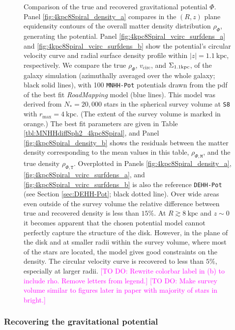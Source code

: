 \documentclass[iop,revtex4,numberedappendix,appendixfloats]{emulateapj}
\newcommand{\RM}{{\sl RoadMapping}}
\newcommand{\Wilma}[1]{\textcolor{Magenta}{#1}}
\begin{document}
\begin{figure}[!htbp]
\begin{minipage}{\textwidth}
    \end{minipage}
    \caption{Comparison of the true and recovered gravitational potential $\Phi$. Panel \ref{fig:4kpc8Spiral_density_a} compares in the $(R,z)$ plane equidensity contours of the overall matter density distribution $\rho_{\Phi}$, generating the potential. Panel \ref{fig:4kpc8Spiral_vcirc_surfdens_a} and \ref{fig:4kpc8Spiral_vcirc_surfdens_b} show the potential's circular velocity curve and radial surface density profile within $|z|=1.1~\text{kpc}$, respectively. We compare the true $\rho_{\Phi}$, $v_\text{circ}$, and $\Sigma_{\rm 1.1kpc}$, of the galaxy simulation (azimuthally averaged over the whole galaxy; black solid lines), with 100 \texttt{MNHH-Pot} potentials drawn from the pdf of the best fit \RM{} model (blue lines). This model was derived from $N_*=20,000$ stars in the spherical survey volume at \texttt{S8} with $r_\text{max}=4~\text{kpc}$. (The extent of the survey volume is marked in orange.) The best fit parameters are given in Table \ref{tbl:MNHHdiffSph2_4kpc8Spiral}, and Panel \ref{fig:4kpc8Spiral_density_b} shows the residuals between the matter density corresponding to the mean values in this table, $\rho_{\Phi,\texttt{M}}$, and the true density  $\rho_{\Phi,\texttt{T}}$. Overplotted in Panels \ref{fig:4kpc8Spiral_density_a}, \ref{fig:4kpc8Spiral_vcirc_surfdens_a}, and \ref{fig:4kpc8Spiral_vcirc_surfdens_b} is also the reference \texttt{DEHH-Pot} (see Section \ref{sec:DEHH-Pot}; black dotted line). Over wide areas even outside of the survey volume the relative difference between true and recovered density is less than $15\%$. At $R\gtrsim8~\text{kpc}$ and $z\sim0$ it becomes apparent that the chosen potential model cannot perfectly capture the structure of the disk. However, in the plane of the disk and at smaller radii within the survey volume, where most of the stars are located, the model gives good constraints on the density. The circular velocity curve is recovered to less than $5\%$, especially at larger radii. \Wilma{[TO DO: Rewrite colorbar label in (b) to include rho. Remove letters from legend.]} \Wilma{[TO DO: Make survey volume similar to figures later in paper with majority of stars in bright.]}}
\label{fig:4kpc8Spiral_dens_vcirc_surfdens}
\end{figure}

\subsubsection{Recovering the gravitational potential} \label{sec:4kpc8Spiral_potential}
\end{document}
